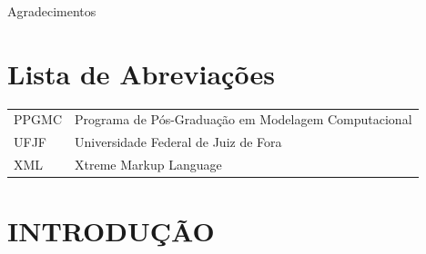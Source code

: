 \documentclass[a4paper,12pt]{monografia}
\theoremstyle{plain}
\theoremstyle{definition}
\theoremstyle{remark}
\begin{document}



 \indent\indent 
Agradecimentos
\newpage










\chapter*{Lista de Abrevia\c{c}\~oes} 
\doublespacing  \begin{tabular}{l l}

PPGMC & Programa de Pós-Graduação em Modelagem Computacional \\
UFJF & Universidade Federal de Juiz de Fora  \\
XML & Xtreme Markup Language



\end{tabular}  \thispagestyle{empty}




%
%
%
\pagestyle{ruledheader}
 

\chapter{INTRODUÇÃO}\label{sec:intro}  %
\end{document}

